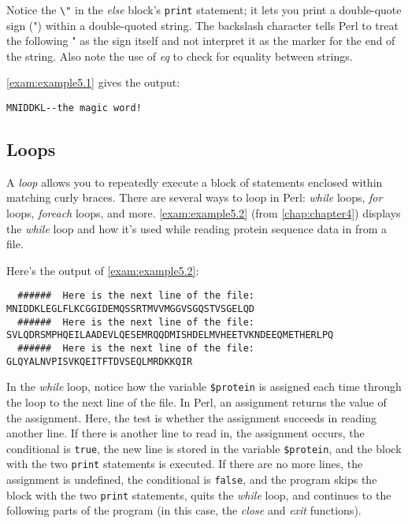

Notice the \verb|\"| in the \textit{else} block's \verb|print| statement; it lets you print a double-quote sign (") within a double-quoted string. The backslash character tells Perl to treat the following " as the sign itself and not interpret it as the marker for the end of the string. Also note the use of \textit{eq} to check for equality between strings.

\autoref{exam:example5.1} gives the output:

\begin{lstlisting}
MNIDDKL--the magic word!
\end{lstlisting}

\subsection{Loops}
A \textit{loop} allows you to repeatedly execute a block of statements enclosed within matching curly braces. There are several ways to loop in Perl: \textit{while} loops, \textit{for} loops, \textit{foreach} loops, and more. \autoref{exam:example5.2} (from \autoref{chap:chapter4}) displays the \textit{while} loop and how it's used while reading protein sequence data in from a file. 



Here's the output of \autoref{exam:example5.2}:

\begin{lstlisting}
  ######  Here is the next line of the file:
MNIDDKLEGLFLKCGGIDEMQSSRTMVVMGGVSGQSTVSGELQD
  ######  Here is the next line of the file:
SVLQDRSMPHQEILAADEVLQESEMRQQDMISHDELMVHEETVKNDEEQMETHERLPQ
  ######  Here is the next line of the file:
GLQYALNVPISVKQEITFTDVSEQLMRDKKQIR
\end{lstlisting}

In the \textit{while} loop, notice how the variable \verb|$protein| is assigned each time through the loop to the next line of the file. In Perl, an assignment returns the value of the assignment. Here, the test is whether the assignment succeeds in reading another line. If there is another line to read in, the assignment occurs, the conditional is \verb|true|, the new line is stored in the variable \verb|$protein|, and the block with the two \verb|print| statements is executed. If there are no more lines, the assignment is undefined, the conditional is \verb|false|, and the program skips the block with the two \verb|print| statements, quits the \textit{while} loop, and continues to the following parts of the program (in this case, the \textit{close} and \textit{exit} functions). 

